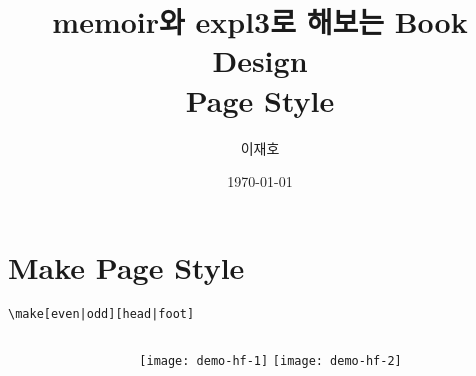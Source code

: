 \documentclass{beamer}
\title{%
  {\large memoir와 expl3로 해보는 Book Design}\\
  Page Style
}
\author{이재호}
\institute{memoir 스터디 그룹}
\date{\today}
\begin{document}
\maketitle

\section{Make Page Style}

\begin{frame}[fragile]{\texttt{\textbackslash make[even|odd][head|foot]}}
  \begin{columns}
    \begin{column}{0.6\textwidth}
      \begin{latexcode}
      \end{latexcode}
    \end{column}

    \begin{column}{0.4\textwidth}
      \begin{overprint}
        \texttt{[image: demo-hf-1]}
        \texttt{[image: demo-hf-2]}
      \end{overprint}
    \end{column}
  \end{columns}
\end{frame}
\end{document}
